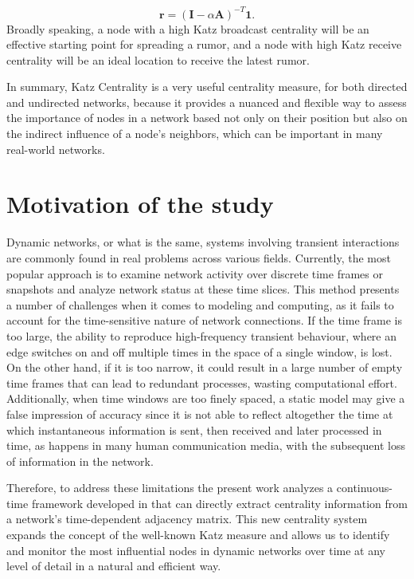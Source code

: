 \begin{equation}
\label{eqn:receiv}
    \mathbf{r} = (\mathbf{I}-\alpha\mathbf{A})^{-T} \mathbf{1}.
\end{equation}
Broadly speaking, a node with a high Katz broadcast centrality will be an effective starting point for spreading a rumor, and a node with high Katz receive centrality will be an ideal location to receive the latest rumor.

In summary, Katz Centrality is a very useful centrality measure, for both directed and undirected networks, because it provides a nuanced and flexible way to assess the importance of nodes in a network based not only on their position but also on the indirect influence of a node's neighbors, which can be important in many real-world networks.



\section{Motivation of the study}
\label{sec:motiv}
Dynamic networks, or what is the same, systems involving transient interactions are commonly found in real problems across various fields. Currently, the most popular approach is to examine network activity over discrete time frames or snapshots and analyze network status at these time slices. This method presents a number of challenges when it comes to modeling and computing, as it fails to account for the time-sensitive nature of network connections. If the time frame is too large, the ability to reproduce high-frequency transient behaviour, where an edge switches on and off multiple times in the space of a single window, is lost. On the other hand, if it is too narrow, it could result in a large number of empty time frames that can lead to redundant processes, wasting computational effort. Additionally, when time windows are too finely spaced, a static model may give a false impression of accuracy since it is not able to reflect altogether the time at which instantaneous information is sent, then received and later processed in time, as happens in many human communication media, with the subsequent loss of information in the network.

Therefore, to address these limitations the present work analyzes a continuous-time framework developed in \cite{grindrod2014dynamical} that can directly extract centrality information from a network's time-dependent adjacency matrix. This new centrality system expands the concept of the well-known Katz measure and allows us to identify and monitor the most influential nodes in dynamic networks over time at any level of detail in a natural and efficient way.

